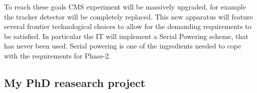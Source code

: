 \documentclass[a4paper,11pt,english]{article}
\begin{document}
To reach these goals CMS experiment will be massively upgraded, for example the tracker detector will be completely replaced. 
This new apparatus will feature several frontier technological choices to allow for the demanding requirements to be satisfied.  
In particular the IT %
will implement a Serial Powering scheme, that has never been used.  Serial powering is one of the ingredients  needed to cope with the requirements for Phase-2. %

\subsection*{My PhD reasearch project}
\end{document}
